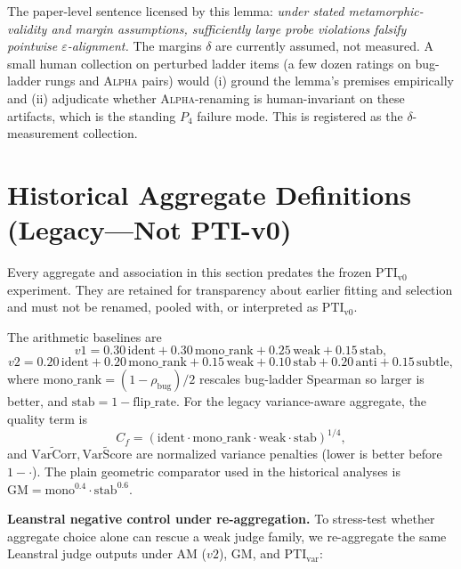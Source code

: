 \documentclass{article}
\newcommand{\PTI}{\mathrm{PTI}}                  %
\newcommand{\PTIvzero}{\PTI_{\mathrm{v0}}}        %
\newcommand{\PTIvar}{\PTI_{\mathrm{var}}}        %
\begin{document}
The paper-level sentence licensed by this lemma: \emph{under stated metamorphic-validity and margin assumptions, sufficiently large probe violations falsify pointwise $\varepsilon$-alignment.}
The margins $\delta$ are currently assumed, not measured.
A small human collection on perturbed ladder items (a few dozen ratings on bug-ladder rungs and \textsc{Alpha} pairs) would (i) ground the lemma's premises empirically and (ii) adjudicate whether \textsc{Alpha}-renaming is human-invariant on these artifacts, which is the standing $P_4$ failure mode.
This is registered as the $\delta$-measurement collection.

\section{Historical Aggregate Definitions (Legacy---Not PTI-v0)}\label{app:index-definitions}

Every aggregate and association in this section predates the frozen $\PTIvzero$ experiment. They are retained for transparency about earlier fitting and selection and must not be renamed, pooled with, or interpreted as $\PTIvzero$.

The arithmetic baselines are
\[
  v1 = 0.30\,\text{ident} + 0.30\,\text{mono\_rank} + 0.25\,\text{weak} + 0.15\,\text{stab},
\]
\[
  v2 = 0.20\,\text{ident} + 0.20\,\text{mono\_rank} + 0.15\,\text{weak} + 0.10\,\text{stab} + 0.20\,\text{anti} + 0.15\,\text{subtle},
\]
where $\text{mono\_rank}=(1-\rho_{\text{bug}})/2$ rescales bug-ladder Spearman so larger is better, and $\text{stab}=1-\text{flip\_rate}$.
For the legacy variance-aware aggregate, the quality term is
\[
  C_f = \left(\text{ident}\cdot\text{mono\_rank}\cdot\text{weak}\cdot\text{stab}\right)^{1/4},
\]
and $\widetilde{\mathrm{VarCorr}}, \widetilde{\mathrm{VarScore}}$ are normalized variance penalties (lower is better before $1-\cdot$).
The plain geometric comparator used in the historical analyses is $\mathrm{GM}=\mathrm{mono}^{0.4}\cdot\mathrm{stab}^{0.6}$.

\textbf{Leanstral negative control under re-aggregation.}
To stress-test whether aggregate choice alone can rescue a weak judge family, we re-aggregate the same Leanstral judge outputs under AM ($v2$), GM, and $\PTIvar$:
\end{document}
